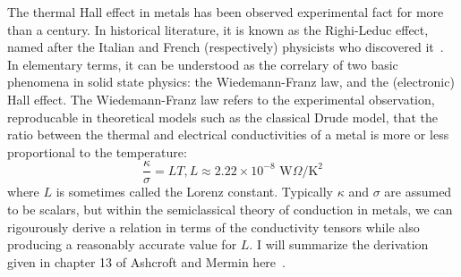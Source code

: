 \documentclass{thesis-umich}
\begin{document}
The thermal Hall effect in metals has been observed experimental fact for more
than a century. In historical literature, it is known as the Righi-Leduc effect,
named after the Italian and French (respectively) physicists who discovered
it~\cite{Bridgman1924}. In elementary terms, it can be understood as the
correlary of two basic phenomena in solid state physics: the Wiedemann-Franz
law, and the (electronic) Hall effect. The Wiedemann-Franz law refers to the
experimental observation, reproducable in theoretical models such as the
classical Drude model, that the ratio between the thermal and electrical
conductivities of a metal is more or less proportional to the temperature:
\[ \frac{\kappa}{\sigma} = LT, L \approx 2.22 \times 10^{-8}
\textrm{ W}\Omega/\mathrm{K}^2\]
where $L$ is sometimes called the Lorenz constant. Typically $\kappa$ and
$\sigma$ are assumed to be scalars, but within the semiclassical theory of
conduction in metals, we can rigourously derive a relation in terms of the
conductivity tensors while also producing a reasonably accurate value for
$L$. I will summarize the derivation given in chapter 13 of Ashcroft and Mermin
here~\cite{AshcroftMermin}. 
\end{document}
